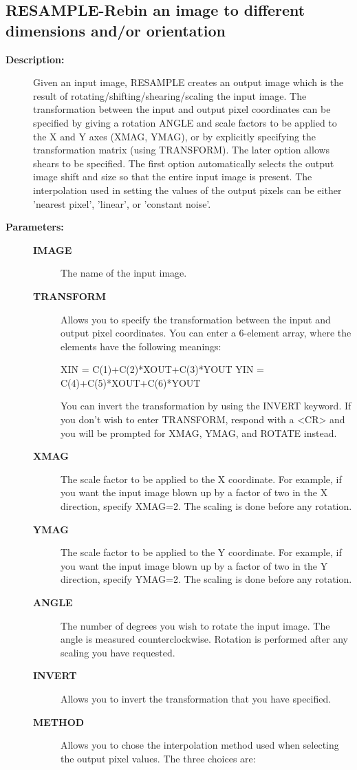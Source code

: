 \subsection{RESAMPLE-\label{RESAMPLE}Rebin an image to different dimensions and/or orientation}
\begin{description}

\item [{\bf Description:}]
 Given an input image, RESAMPLE creates an output image which
 is the result of rotating/shifting/shearing/scaling the input
 image. The transformation between the input and output pixel
 coordinates can be specified by giving a rotation ANGLE and
 scale factors to be applied to the X and Y axes (XMAG, YMAG),
 or by explicitly specifying the transformation matrix (using
 TRANSFORM). The later option allows shears to be specified.
 The first option automatically selects the output image
 shift and size so that the entire input image is present.
 The interpolation used in setting the values of the output
 pixels can be either 'nearest pixel', 'linear', or 'constant
 noise'.

\item [{\bf Parameters:}]
\begin{description}
\item [{\bf IMAGE}]
 The name of the input image.
\item [{\bf TRANSFORM}]
 Allows you to specify the transformation between the input
 and output pixel coordinates.  You can enter a 6-element
 array, where the elements have the following meanings:

    XIN = C(1)+C(2)*XOUT+C(3)*YOUT
    YIN = C(4)+C(5)*XOUT+C(6)*YOUT

 You can invert the transformation by using the INVERT
 keyword. If you don't wish to enter TRANSFORM, respond
 with a <CR> and you will be prompted for XMAG, YMAG,
 and ROTATE instead.
\item [{\bf XMAG}]
 The scale factor to be applied to the X
 coordinate. For example, if you want the input image
 blown up by a factor of two in the X direction, specify
 XMAG=2. The scaling is done before any rotation.
\item [{\bf YMAG}]
 The scale factor to be applied to the Y
 coordinate. For example, if you want the input image
 blown up by a factor of two in the Y direction, specify
 YMAG=2. The scaling is done before any rotation.
\item [{\bf ANGLE}]
 The number of degrees you wish to rotate the
 input image. The angle is measured counterclockwise.
 Rotation is performed after any scaling you have
 requested.
\item [{\bf INVERT}]
 Allows you to invert the transformation that you
 have specified.
\item [{\bf METHOD}]
 Allows you to chose the interpolation method
 used when selecting the output pixel values. The three
 choices are:


\end{description}
\end{description}
